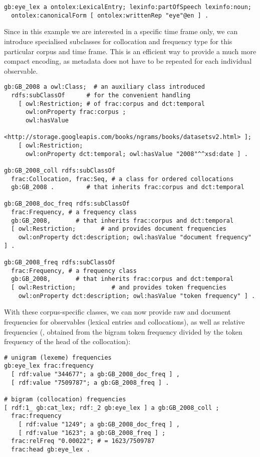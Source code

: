 \documentclass[output=paper,colorlinks,citecolor=brown]{langscibook}
\begin{document}
{\listingsize
\begin{verbatim}
gb:eye_lex a ontolex:LexicalEntry; lexinfo:partOfSpeech lexinfo:noun;
  ontolex:canonicalForm [ ontolex:writtenRep "eye"@en ] .
\end{verbatim}
}

\noindent
Since in this example we are interested in a specific time frame only, we can introduce specialised subclasses for collocation and frequency type for this particular corpus and time frame. This is an efficient way to provide a much more compact encoding, as metadata does not have to be repeated for each individual observable.

{\listingsize
\begin{verbatim}
gb:GB_2008 a owl:Class;  # an auxiliary class introduced
  rdfs:subClassOf      # for the convenient handling
    [ owl:Restriction; # of frac:corpus and dct:temporal
      owl:onProperty frac:corpus ;
      owl:hasValue
        <http://storage.googleapis.com/books/ngrams/books/datasetsv2.html> ];
    [ owl:Restriction;
      owl:onProperty dct:temporal; owl:hasValue "2008"^^xsd:date ] .

gb:GB_2008_coll rdfs:subClassOf
  frac:Collocation, frac:Seq, # a class for ordered collocations
  gb:GB_2008 .         # that inherits frac:corpus and dct:temporal

gb:GB_2008_doc_freq rdfs:subClassOf
  frac:Frequency, # a frequency class
  gb:GB_2008,       # that inherits frac:corpus and dct:temporal
  [ owl:Restriction;       # and provides document frequencies
    owl:onProperty dct:description; owl:hasValue "document frequency" ] .

gb:GB_2008_freq rdfs:subClassOf
  frac:Frequency, # a frequency class
  gb:GB_2008,       # that inherits frac:corpus and dct:temporal
  [ owl:Restriction;          # and provides token frequencies
    owl:onProperty dct:description; owl:hasValue "token frequency" ] .
\end{verbatim}
}

\noindent
With these corpus-specific classes, we can now provide raw and document frequencies for observables (lexical entries and collocations), as well as relative frequencies (, obtained from the bigram token frequency divided by the token frequency of the head of the collocation):

{\listingsize
\begin{verbatim}
# unigram (lexeme) frequencies
gb:eye_lex frac:frequency
  [ rdf:value "344677"; a gb:GB_2008_doc_freq ] ,
  [ rdf:value "7509787"; a gb:GB_2008_freq ] .

# bigram (collocation) frequencies
[ rdf:1_ gb:cat_lex; rdf:_2 gb:eye_lex ] a gb:GB_2008_coll ;
  frac:frequency
    [ rdf:value "1249"; a gb:GB_2008_doc_freq ] ,
    [ rdf:value "1623"; a gb:GB_2008_freq ] ;
  frac:relFreq "0.00022"; # = 1623/7509787
  frac:head gb:eye_lex .
\end{verbatim}
}
\end{document}
